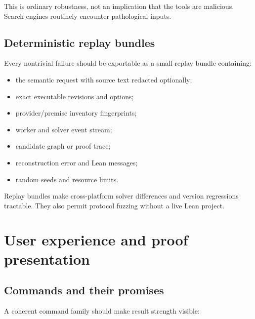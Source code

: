 \documentclass[11pt,letterpaper,openany]{report}
\begin{document}
This is ordinary robustness, not an implication that the tools are malicious. Search
engines routinely encounter pathological inputs.

\section{Deterministic replay bundles}

Every nontrivial failure should be exportable as a small replay bundle containing:

\begin{itemize}
  \item the semantic request with source text redacted optionally;
  \item exact executable revisions and options;
  \item provider/premise inventory fingerprints;
  \item worker and solver event stream;
  \item candidate graph or proof trace;
  \item reconstruction error and Lean messages;
  \item random seeds and resource limits.
\end{itemize}

Replay bundles make cross-platform solver differences and version regressions
tractable. They also permit protocol fuzzing without a live Lean project.

\chapter{User experience and proof presentation}
\label{ch:ux}

\section{Commands and their promises}

A coherent command family should make result strength visible:
\end{document}
